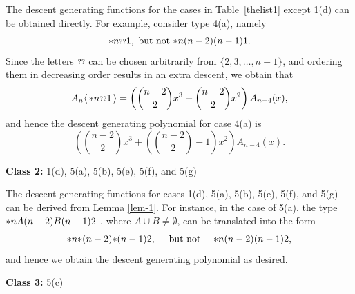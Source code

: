 \documentclass[11pt]{article}
\newcommand{\st}{\mbox{\ensuremath{\ast}}}
\newcommand{\q}{\mbox{\ensuremath{\scriptstyle{?}}}}
\newcommand{\+}{\mbox{\ensuremath{\scriptstyle{+}}}}
\newcommand{\glob}[1]{\ensuremath{\langle\, #1\,\rangle}}
\begin{document}
The descent generating functions for the cases in Table~\ref{thelist1}  except 1(d) can be obtained directly.
For example, consider type 4(a), namely $$\st n\q \q 1, \mbox{ but not } \st n(n-2)(n-1)1.$$
Since the letters $\q \q$ can be  chosen arbitrarily from $\{2, 3, \ldots, n-1 \}$,  and ordering them in decreasing order results in an extra descent, we obtain that
$$A_n \glob{ \st n\q \q 1 } = \left( \binom{n-2}{2}x^3 + \binom{n-2}{2}  x^2 \right) A_{n-4}(x), $$
and hence the descent generating polynomial for case 4(a) is
$$ \left( \binom{n-2}{2}x^3 +\left(\binom{n-2}{2}-1\right)x^2 \right) A_{n-4}(x). $$

\noindent \textbf{Class 2:} 1(d), 5(a), 5(b), 5(e), 5(f), and 5(g)

The  descent generating functions for cases 1(d), 5(a), 5(b), 5(e), 5(f), and 5(g) can be derived from Lemma \ref{lem-1}.
For instance, in the case of 5(a),  the type
$\st n A (n-2) B(n-1)2$ , where $A\cup B\neq \emptyset$, can be translated into the  form $$\st n\st (n-2) \st (n-1)2, \quad \mbox{  but not  } \quad   \st n (n-2)  (n-1)2,$$ and hence we obtain the  descent generating polynomial as desired.

\noindent \textbf{Class 3:} 5(c)
\end{document}
